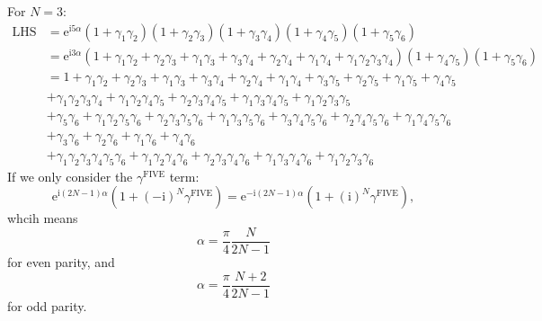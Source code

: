 \documentclass{book}
\begin{document}
For $N=3$:
\begin{equation*}
\begin{aligned}
\mathrm{LHS} & =\mathrm{e}^{\mathrm{i} 5\alpha }( 1+\gamma _{1} \gamma _{2})( 1+\gamma _{2} \gamma _{3})( 1+\gamma _{3} \gamma _{4})( 1+\gamma _{4} \gamma _{5})( 1+\gamma _{5} \gamma _{6})\\
 & =\mathrm{e}^{\mathrm{i} 3\alpha }( 1+\gamma _{1} \gamma _{2} +\gamma _{2} \gamma _{3} +\gamma _{1} \gamma _{3} +\gamma _{3} \gamma _{4} +\gamma _{2} \gamma _{4} +\gamma _{1} \gamma _{4} +\gamma _{1} \gamma _{2} \gamma _{3} \gamma _{4})( 1+\gamma _{4} \gamma _{5})( 1+\gamma _{5} \gamma _{6})\\
 & =1+\gamma _{1} \gamma _{2} +\gamma _{2} \gamma _{3} +\gamma _{1} \gamma _{3} +\gamma _{3} \gamma _{4} +\gamma _{2} \gamma _{4} +\gamma _{1} \gamma _{4} +\gamma _{3} \gamma _{5} +\gamma _{2} \gamma _{5} +\gamma _{1} \gamma _{5} +\gamma _{4} \gamma _{5}\\
 & +\gamma _{1} \gamma _{2} \gamma _{3} \gamma _{4} +\gamma _{1} \gamma _{2} \gamma _{4} \gamma _{5} +\gamma _{2} \gamma _{3} \gamma _{4} \gamma _{5} +\gamma _{1} \gamma _{3} \gamma _{4} \gamma _{5} +\gamma _{1} \gamma _{2} \gamma _{3} \gamma _{5}\\
 & +\gamma _{5} \gamma _{6} +\gamma _{1} \gamma _{2} \gamma _{5} \gamma _{6} +\gamma _{2} \gamma _{3} \gamma _{5} \gamma _{6} +\gamma _{1} \gamma _{3} \gamma _{5} \gamma _{6} +\gamma _{3} \gamma _{4} \gamma _{5} \gamma _{6} +\gamma _{2} \gamma _{4} \gamma _{5} \gamma _{6} +\gamma _{1} \gamma _{4} \gamma _{5} \gamma _{6}\\
 & +\gamma _{3} \gamma _{6} +\gamma _{2} \gamma _{6} +\gamma _{1} \gamma _{6} +\gamma _{4} \gamma _{6}\\
 & +\gamma _{1} \gamma _{2} \gamma _{3} \gamma _{4} \gamma _{5} \gamma _{6} +\gamma _{1} \gamma _{2} \gamma _{4} \gamma _{6} +\gamma _{2} \gamma _{3} \gamma _{4} \gamma _{6} +\gamma _{1} \gamma _{3} \gamma _{4} \gamma _{6} +\gamma _{1} \gamma _{2} \gamma _{3} \gamma _{6}
\end{aligned}
\end{equation*}
If we only consider the $\gamma ^{\text{FIVE}}$ term:
\begin{equation*}
\mathrm{e}^{\mathrm{i}( 2N-1) \alpha } (1+( -\mathrm{i})^{N} \gamma ^{\text{FIVE}} )=\mathrm{e}^{-\mathrm{i}( 2N-1) \alpha } (1+(\mathrm{i})^{N} \gamma ^{\text{FIVE}} ),
\end{equation*}
whcih means 
\begin{equation*}
\alpha =\frac{\pi }{4}\frac{N}{2N-1}
\end{equation*}
for even parity, and 
\begin{equation*}
\alpha =\frac{\pi }{4}\frac{N+2}{2N-1}
\end{equation*}
for odd parity.
\end{document}

